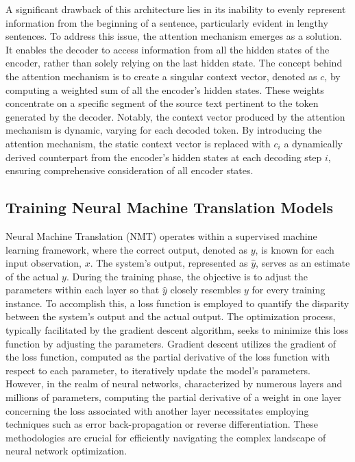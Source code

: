 A significant drawback of this architecture lies in its inability to evenly represent information from the beginning of a sentence, particularly evident in lengthy sentences. 
To address this issue, the attention mechanism emerges as a solution. 
It enables the decoder to access information from all the hidden states of the encoder, rather than solely relying on the last hidden state. 
The concept behind the attention mechanism is to create a singular context vector, denoted as $c$, by computing a weighted sum of all the encoder's hidden states. 
These weights concentrate on a specific segment of the source text pertinent to the token generated by the decoder. 
Notably, the context vector produced by the attention mechanism is dynamic, varying for each decoded token. 
By introducing the attention mechanism, the static context vector is replaced with $c_i$ a dynamically derived counterpart from the encoder's hidden states at each decoding step $i$, ensuring comprehensive consideration of all encoder states.

\subsection{Training Neural Machine Translation Models}
Neural Machine Translation (NMT) operates within a supervised machine learning framework, where the correct output, denoted as $y$, is known for each input observation, $x$. 
The system's output, represented as $\hat{y}$, serves as an estimate of the actual $y$. 
During the training phase, the objective is to adjust the parameters within each layer so that $\hat{y}$ closely resembles $y$ for every training instance.
To accomplish this, a loss function is employed to quantify the disparity between the system's output and the actual output. 
The optimization process, typically facilitated by the gradient descent algorithm, seeks to minimize this loss function by adjusting the parameters. 
Gradient descent utilizes the gradient of the loss function, computed as the partial derivative of the loss function with respect to each parameter, to iteratively update the model's parameters. 
However, in the realm of neural networks, characterized by numerous layers and millions of parameters, computing the partial derivative of a weight in one layer concerning the loss associated with another layer necessitates employing techniques such as error back-propagation or reverse differentiation. 
These methodologies are crucial for efficiently navigating the complex landscape of neural network optimization.


